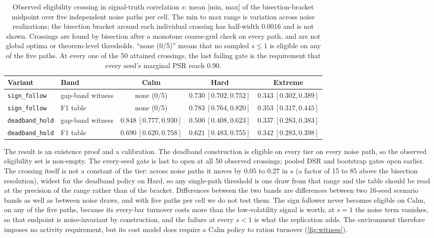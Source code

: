 \begin{table}[t]
\centering
\caption{Observed eligibility crossing in signal-truth correlation $s$: mean [min, max] of the bisection-bracket midpoint over five independent noise paths per cell. The min to max range is variation across noise realizations; the bisection bracket around each individual crossing has half-width $0.0016$ and is not shown. Crossings are found by bisection after a monotone coarse-grid check on every path, and are not global optima or theorem-level thresholds. ``none (0/5)'' means that no sampled $s\le1$ is eligible on any of the five paths. At every one of the 50 attained crossings, the last failing gate is the requirement that every seed's marginal PSR reach $0.90$.}
\label{tab:witness}
\small
\setlength{\tabcolsep}{3.5pt}
\begin{tabular}{llccc}
\toprule
Variant & Band & Calm & Hard & Extreme \\
\midrule
\texttt{sign\_follow} & gap-band witness & none (0/5) & $0.730\ [0.702,0.752]$ & $0.343\ [0.302,0.389]$ \\
\texttt{sign\_follow} & F1 table & none (0/5) & $0.783\ [0.764,0.820]$ & $0.353\ [0.317,0.445]$ \\
\texttt{deadband\_hold} & gap-band witness & $0.848\ [0.777,0.930]$ & $0.500\ [0.408,0.623]$ & $0.337\ [0.283,0.383]$ \\
\texttt{deadband\_hold} & F1 table & $0.690\ [0.620,0.758]$ & $0.621\ [0.483,0.755]$ & $0.342\ [0.283,0.398]$ \\
\bottomrule
\end{tabular}
\end{table}

The result is an existence proof and a calibration. The deadband construction is eligible on every tier on every noise path, so the observed eligibility set is non-empty. The every-seed gate is last to open at all 50 observed crossings; pooled DSR and bootstrap gates open earlier. The crossing itself is not a constant of the tier: across noise paths it moves by $0.05$ to $0.27$ in $s$ (a factor of 15 to 85 above the bisection resolution), widest for the deadband policy on Hard, so any single-path threshold is one draw from that range and the table should be read at the precision of the range rather than of the bracket. Differences between the two bands are differences between two 16-seed scenario bands as well as between noise draws, and with five paths per cell we do not test them. The sign follower never becomes eligible on Calm, on any of the five paths, because its every-bar turnover costs more than the low-volatility signal is worth; at $s=1$ the noise term vanishes, so that endpoint is noise-invariant by construction, and the failure at every $s<1$ is what the replication adds. The environment therefore imposes no activity requirement, but its cost model does require a Calm policy to ration turnover (\cref{fig:witness}).

